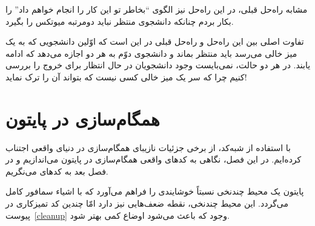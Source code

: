 \documentclass{book}
\newcommand{\clearemptydoublepage}{}%
\begin{document}
    مشابه راه‌حل قبلی، در این راه‌حل نیز الگوی ``بخاطر تو این کار را انجام خواهم داد'' را بکار بردم چنانکه دانشجوی منتظر نباید دومرتبه میوتکس را بگیرد. 

    تفاوت اصلی بین این راه‌حل و راه‌حل قبلی در این است که اوّلین دانشجویی که به یک میز خالی می‌رسد باید منتظر بماند و دانشجوی دوّم به هر دو اجازه 
    می‌دهد که ادامه یابند. در هر دو حالت، نمی‌بایست وجود دانشجویان در حال انتظار برای خروج را بررسی کنیم چرا که سر یک میز خالی کسی نیست که بتواند
    آن را ترک نماید!
    










\chapter{همگام‌سازی در پایتون}
\label{pysync}

    با استفاده از شبه‌کد، از برخی جزئیات نازیبای همگام‌سازی در دنیای واقعی اجتناب کرده‌ایم. 
    در این فصل، نگاهی به کدهای واقعی همگام‌سازی در پایتون می‌اندازیم و در فصل بعد به کدهای  می‌نگریم. 

    پایتون  یک محیط چندنخی نسبتاً خوشایندی را فراهم می‌آورد که با اشیاء سمافور کامل می‌گردد. این محیط چندنخی، نقطه ضعف‌هایی نیز دارد امّا 
    چندین کد  تمیزکاری در پیوست~\ref{cleanup} وجود که باعث می‌شود اوضاع کمی بهتر شود. 
    
\end{document}
